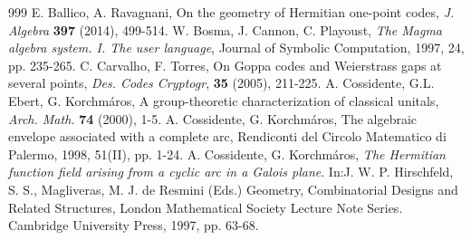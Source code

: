\documentclass[9pt]{article}
\theoremstyle{plain}
\begin{document}
\begin{thebibliography}{999}
  E. Ballico, A. Ravagnani, On the geometry of Hermitian one-point codes, \emph{J. Algebra}
{\bf{397}} (2014), 499-514.
 W. Bosma, J. Cannon, C. Playoust, \textit{The Magma algebra system. I. The user language}, Journal of Symbolic Computation, 1997, 24, pp. 235-265.
 C. Carvalho, F. Torres, On Goppa codes and Weierstrass gaps at several points, \emph{Des. Codes Cryptogr}, {\bf{35}} (2005), 211-225.
A. Cossidente, G.L. Ebert, G. Korchm\'{a}ros, A group-theoretic characterization of classical unitals, \emph{Arch. Math.} { \bf{74}} (2000), 1-5. 
A. Cossidente, G. Korchm\'{a}ros, The algebraic envelope associated with a complete arc, Rendiconti del Circolo Matematico di Palermo, 1998, 51(II), pp. 1-24.
A. Cossidente, G. Korchm\'{a}ros, \textit{The Hermitian function field arising from a cyclic arc in a Galois plane}. In:J. W. P. Hirschfeld, S. S., Magliveras, M. J. de Resmini (Eds.) Geometry, Combinatorial Designs and Related Structures, London Mathematical Society Lecture Note Series. Cambridge University Press, 1997, pp. 63-68.


\end{thebibliography}
\end{document}
